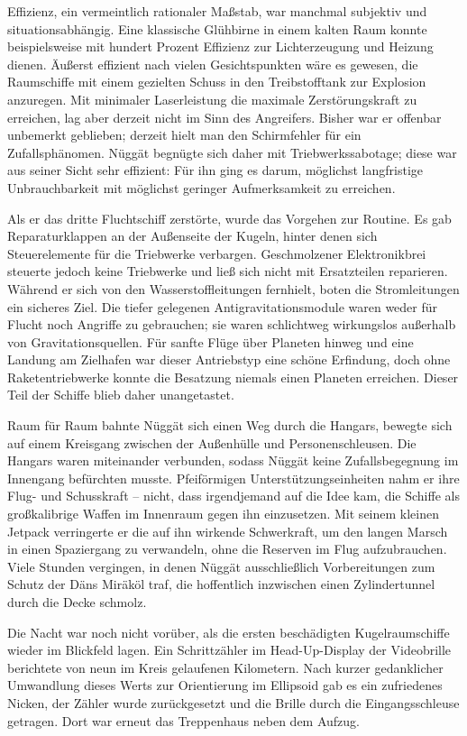Effizienz, ein vermeintlich rationaler Maßstab, war manchmal subjektiv und situationsabhängig. Eine klassische Glühbirne in einem kalten Raum konnte beispielsweise mit hundert Prozent Effizienz zur Lichterzeugung und Heizung dienen. Äußerst effizient nach vielen Gesichtspunkten wäre es gewesen, die Raumschiffe mit einem gezielten Schuss in den Treibstofftank zur Explosion anzuregen. Mit minimaler Laserleistung die maximale Zerstörungskraft zu erreichen, lag aber derzeit nicht im Sinn des Angreifers. Bisher war er offenbar unbemerkt geblieben; derzeit hielt man den Schirmfehler für ein Zufallsphänomen. Nüggät begnügte sich daher mit Triebwerkssabotage; diese war aus seiner Sicht sehr effizient: Für ihn ging es darum, möglichst langfristige Unbrauchbarkeit mit möglichst geringer Aufmerksamkeit zu erreichen.

Als er das dritte Fluchtschiff zerstörte, wurde das Vorgehen zur Routine. Es gab Reparaturklappen an der Außenseite der Kugeln, hinter denen sich Steuerelemente für die Triebwerke verbargen. Geschmolzener Elektronikbrei steuerte jedoch keine Triebwerke und ließ sich nicht mit Ersatzteilen reparieren. Während er sich von den Wasserstoffleitungen fernhielt, boten die Stromleitungen ein sicheres Ziel. Die tiefer gelegenen Antigravitationsmodule waren weder für Flucht noch Angriffe zu gebrauchen; sie waren schlichtweg wirkungslos außerhalb von Gravitationsquellen. Für sanfte Flüge über Planeten hinweg und eine Landung am Zielhafen war dieser Antriebstyp eine schöne Erfindung, doch ohne Raketentriebwerke konnte die Besatzung niemals einen Planeten erreichen. Dieser Teil der Schiffe blieb daher unangetastet.

Raum für Raum bahnte Nüggät sich einen Weg durch die Hangars, bewegte sich auf einem Kreisgang zwischen der Außenhülle und Personenschleusen. Die Hangars waren miteinander verbunden, sodass Nüggät keine Zufallsbegegnung im Innengang befürchten musste. Pfeiförmigen Unterstützungseinheiten nahm er ihre Flug- und Schusskraft – nicht, dass irgendjemand auf die Idee kam, die Schiffe als großkalibrige Waffen im Innenraum gegen ihn einzusetzen. Mit seinem kleinen Jetpack verringerte er die auf ihn wirkende Schwerkraft, um den langen Marsch in einen Spaziergang zu verwandeln, ohne die Reserven im Flug aufzubrauchen. Viele Stunden vergingen, in denen Nüggät ausschließlich Vorbereitungen zum Schutz der Däns Miräköl traf, die hoffentlich inzwischen einen Zylindertunnel durch die Decke schmolz.

Die Nacht war noch nicht vorüber, als die ersten beschädigten Kugelraumschiffe wieder im Blickfeld lagen. Ein Schrittzähler im Head-Up-Display der Videobrille berichtete von neun im Kreis gelaufenen Kilometern. Nach kurzer gedanklicher Umwandlung dieses Werts zur Orientierung im Ellipsoid gab es ein zufriedenes Nicken, der Zähler wurde zurückgesetzt und die Brille durch die Eingangsschleuse getragen. Dort war erneut das Treppenhaus neben dem Aufzug.

